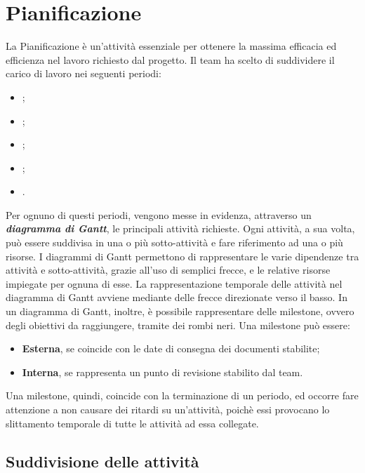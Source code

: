 \newpage

\section{Pianificazione}
La Pianificazione è un'attività essenziale per ottenere la massima efficacia ed efficienza nel lavoro richiesto dal progetto. Il team \textit{\gruppo} ha scelto di suddividere il carico di lavoro nei seguenti periodi:
\begin{itemize}
	\item \textbf{\AR};
	\item \textbf{\PA};
	\item \textbf{\PD};
	\item \textbf{\CO};
	\item \textbf{\VV}.
\end{itemize}
Per ognuno di questi periodi, vengono messe in evidenza, attraverso un \textit{\textbf{diagramma di Gantt}}, le principali attività richieste. Ogni attività, a sua volta, può essere suddivisa in una o più sotto-attività e fare riferimento ad una o più risorse. I diagrammi di Gantt permettono di rappresentare le varie dipendenze tra attività e sotto-attività, grazie all’uso di semplici frecce, e le relative risorse impiegate per ognuna di esse. La rappresentazione temporale delle attività nel diagramma di Gantt avviene mediante delle frecce direzionate verso il basso. In un diagramma di Gantt, inoltre, è possibile rappresentare delle milestone, ovvero degli obiettivi da raggiungere, tramite dei rombi neri. Una milestone può essere:
\begin{itemize}
	\item \textbf{Esterna}, se coincide con le date di consegna dei documenti stabilite;
	\item \textbf{Interna}, se rappresenta un punto di revisione stabilito dal team.
\end{itemize}
Una milestone, quindi, coincide con la terminazione di un periodo, ed occorre fare attenzione a non causare dei ritardi su un'attività, poichè essi provocano lo slittamento temporale di tutte le attività ad essa collegate.

	\subsection{Suddivisione delle attività}
